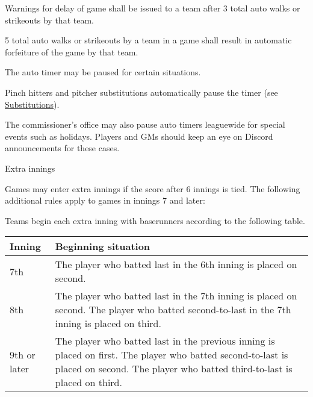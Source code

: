 \begin{deepEnumerate}
\begin{deepEnumerate}
\begin{deepEnumerate}
			\item Warnings for delay of game shall be issued to a team after 3 total auto walks or strikeouts by that team.
			\item 5 total auto walks or strikeouts by a team in a game shall result in automatic forfeiture of the game by that team.
		\end{deepEnumerate}
		\item The auto timer may be paused for certain situations.
		\begin{deepEnumerate}
			\item Pinch hitters and pitcher substitutions automatically pause the timer (see \hyperref[sec:substitutions]{Substitutions}).
			\item The commissioner’s office may also pause auto timers leaguewide for special events such as holidays. 
			Players and GMs should keep an eye on Discord announcements for these cases.
		\end{deepEnumerate}
	\end{deepEnumerate}
	\item Extra innings
	\label{sec:extra innings}
	\begin{deepEnumerate}
		\item Games may enter extra innings if the score after 6 innings is tied. 
		The following additional rules apply to games in innings 7 and later:
		\begin{deepEnumerate}
			\item Teams begin each extra inning with baserunners according to the following table.
			\begin{center}										                
				\begin{longtable}{|p{3cm}|p{8cm}|}
					\hline
					\textbf{Inning} & \textbf{Beginning situation}                                          \\
					\hline
					7th             & The player who batted last in the 6th inning is placed on second.     \\
					\hline
					8th             & The player who batted last in the 7th inning is placed on second.     
					The player who batted second-to-last in the 7th inning is placed on third. \\
					\hline
					9th or later    & The player who batted last in the previous inning is placed on first. 
					The player who batted second-to-last is placed on second.
					The player who batted third-to-last is placed on third. \\
					\hline
				\end{longtable}

\end{center}
\end{deepEnumerate}
\end{deepEnumerate}
\end{deepEnumerate}
